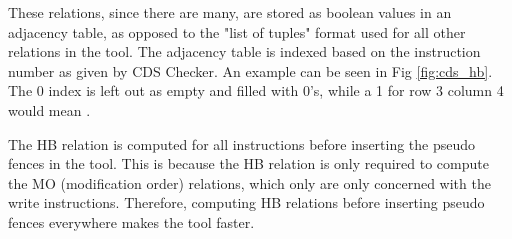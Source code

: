 \par
These relations, since there are many, are stored as boolean values in an adjacency table, as opposed to the "list of tuples" format used for all other relations in the tool. The adjacency table is indexed based on the instruction number as given by CDS Checker. An example can be seen in Fig \ref{fig:cds_hb}. The 0 index is left out as empty and filled with 0's, while a 1 for row 3 column 4 would mean .

%	

\par
The HB relation is computed for all instructions before inserting the pseudo fences in the tool. This is because the HB relation is only required to compute the MO (modification order) relations, which only are only concerned with the write instructions. Therefore, computing HB relations before inserting pseudo fences everywhere makes the tool faster.


